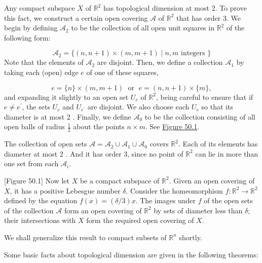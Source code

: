 \begin{centeredblock*}
\begin{example}
\label{ex:\thesection.\theexample}
Any compact subspace \(X\) of \(\mathbb{R}^{2}\) has topological dimension at most 2. To prove this fact, we construct a certain open covering \(\mathcal{A}\) of \(\mathbb{R}^{2}\) that has order 3. We begin by defining \(\mathcal{A}_{2}\) to be the collection of all open unit squares in \(\mathbb{R}^{2}\) of the following form:

\[
\mathcal{A}_{2} = \{ ({n,n + 1}) \times ({m,m + 1}) \mid n,m\text{ integers }\}
\]
Note that the elements of \(\mathcal{A}_{2}\) are disjoint. Then, we define a collection \(\mathcal{A}_{1}\) by taking each (open) edge \(e\) of one of these squares,

\[
e = \{ n\} \times ({m,m + 1}) \;\text{ or }\;e = ({n,n + 1}) \times \{ m\},
\]
and expanding it slightly to an open set \(U_{e}\) of \(\mathbb{R}^{2}\), being careful to ensure that if \(e \neq {e}^{\prime }\), the sets \(U_{e}\) and \(U_{e^{\prime }}\) are disjoint. We also choose each \(U_{e}\) so that its diameter is at most 2 . Finally, we define \(\mathcal{A}_{0}\) to be the collection consisting of all open balls of radius \(\frac{1}{2}\) about the points \(n \times m\). See \hyperref[fig:50.1]{Figure 50.1}.

The collection of open sets \(\mathcal{A} = \mathcal{A}_{2} \cup {\mathcal{A}}_{1} \cup {\mathcal{A}}_{0}\) covers \(\mathbb{R}^{2}\). Each of its elements has diameter at most 2 . And it has order 3, since no point of \(\mathbb{R}^{2}\) can lie in more than one set from each \(\mathcal{A}_{i}\).

[Figure 50.1]
Now let \(X\) be a compact subspace of \(\mathbb{R}^{2}\). Given an open covering of \(X\), it has a positive Lebesgue number \(\delta\). Consider the homeomorphism \(f : \mathbb{R}^{2} \rightarrow {\mathbb{R}}^{2}\) defined by the equation \(f(x) = ({\delta /3}) x\). The images under \(f\) of the open sets of the collection \(\mathcal{A}\) form an open covering of \(\mathbb{R}^{2}\) by sets of diameter less than \(\delta\); their intersections with \(X\) form the required open covering of \(X\).

We shall generalize this result to compact subsets of \(\mathbb{R}^{n}\) shortly.
\end{example}
\end{centeredblock*}

Some basic facts about topological dimension are given in the following theorems:

